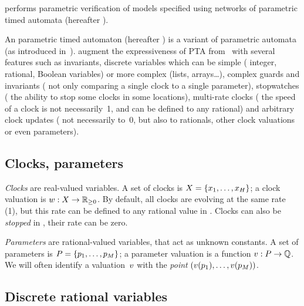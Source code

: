 \imitator{} performs parametric verification of models specified using networks of \imitator{} parametric timed automata (hereafter \NIPTA{}).

An \imitator{} parametric timed automaton (hereafter \IPTA{}) is a variant of parametric automata (as introduced in~\cite{AHV93}).
\IPTA{} augment the expressiveness of PTA from~\cite{AHV93} with several features such as invariants, discrete variables which can be simple (\eg{} integer, rational, Boolean variables) or more complex (lists, arrays…), complex guards and invariants (\ie{} not only comparing a single clock to a single parameter), stopwatches (\ie{} the ability to stop some clocks in some locations), multi-rate clocks (\ie{} the speed of a clock is not necessarily~1, and can be defined to any rational) and arbitrary clock updates (\ie{} not necessarily to~0, but also to rationals, other clock valuations or even parameters).


\subsection{Clocks, parameters}

\emph{Clocks} are real-valued variables.
A set of clocks is $X = \{ x_1, \dots, x_H \}$;
a clock valuation is
$w : X \rightarrow \mathbb R_{\geq 0}$.
By default, all clocks are evolving at the same rate (1), but this rate can be defined to any rational value in \imitator{}.
Clocks can also be \emph{stopped} in \imitator{}, \ie{} their rate can be zero.

\emph{Parameters} are rational-valued variables, that act as unknown constants.
A set of parameters is $P = \{ p_1, \dots, p_M \} $;
a parameter valuation is a function $v : P \rightarrow \mathbb Q$.
We will often identify a valuation~$v$ with the \emph{point} $(v(p_1), \dots, v(p_{M}))$.


\subsection{Discrete rational variables}\label{subsection:rational}

